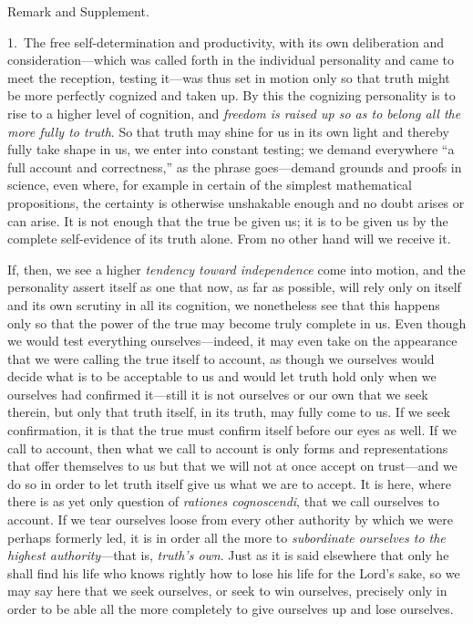 \documentclass[12pt,a4paper]{book}
\begin{document}
\begin{center}Remark and Supplement.\end{center}
1.~The free self-determination and productivity, with its own deliberation and
consideration---which was called forth in the individual personality and came to
meet the reception, testing it---was thus set in motion only so that truth might
be more perfectly cognized and taken up. By this the cognizing personality is to
rise to a higher level of cognition, and \emph{freedom is raised up so as to belong all
the more fully to truth}. So that truth may shine for us in its own light and
thereby fully take shape in us, we enter into constant testing; we demand
everywhere ``a full account and correctness,'' as the phrase goes---demand grounds
and proofs in science, even where, for example in certain of the simplest
mathematical propositions, the certainty is otherwise unshakable enough and no
doubt arises or can arise. It is not enough that the true be given us; it is to be
given us by the complete self-evidence of its truth alone. From no other hand will
we receive it.

If, then, we see a higher \emph{tendency toward independence} come into motion,
and the personality assert itself as one that now, as far as possible, will rely
only on itself and its own scrutiny in all its cognition, we nonetheless see that
this happens only so that the power of the true may become truly complete in us.
Even though we would test everything ourselves---indeed, it may even take on the
appearance that we were calling the true itself to account, as though we ourselves
would decide what is to be acceptable to us and would let truth hold only when we
ourselves had confirmed it---still it is not ourselves or our own that we seek
therein, but only that truth itself, in its truth, may fully come to us. If we
seek confirmation, it is that the true must confirm itself before our eyes as
well. If we call to account, then what we call to account is only forms and
representations that offer themselves to us but that we will not at once accept on
trust---and we do so in order to let truth itself give us what we are to accept. It
is here, where there is as yet only question of \textit{rationes cognoscendi},
that we call ourselves to account. If we tear ourselves loose from every other
authority by which we were perhaps formerly led, it is in order all the more to
\emph{subordinate ourselves to the highest authority}---that is, \emph{truth's own}. Just
as it is said elsewhere that only he shall find his life who knows rightly how to
lose his life for the Lord's sake, so we may say here that we seek ourselves, or
seek to win ourselves, precisely only in order to be able all the more completely
to give ourselves up and lose ourselves.
\end{document}
